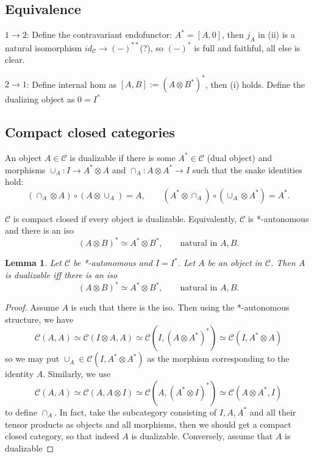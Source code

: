 \documentclass[12pt]{article}
\newtheorem{lemma}{Lemma}
\theoremstyle{definition}
\theoremstyle{remark}
\def\Ce{\mathcal C}
\begin{document}
\subsection{Equivalence}

{$1\to 2$:} \enspace
Define the contravariant endofunctor: $A^*=[A,0]$, then $j_A$ in (ii) is a natural
isomorphism $id_\Ce \to (-)^{**}$(?), so $(-)^*$ is full and faithful, all else is clear.

\medskip

\noindent 
$2\to 1$: \enspace
Define internal hom as $[A,B]:=(A\otimes B^*)^*$, then (i) holds. Define the dualizing object as $0=I^*$

\subsection{Compact closed categories}


An object $A\in \Ce$ is dualizable if there is some $A^*\in \Ce$ (dual object) and
morphisms $\cup_A: I\to A^*\otimes A$ and $\cap_A: A\otimes A^*\to I$ such that the snake
identities hold:
\[
(\cap_A\otimes A)\circ (A\otimes \cup_A)=A,\qquad (A^*\otimes
\cap_A)\circ (\cup_A\otimes A^*)=A^*.
\]

$\Ce$ is compact closed if every object is dualizable.
Equivalently, $\Ce$ is *-autonomous and there is an iso 
\[
(A\otimes B)^*\simeq A^*\otimes B^*,\qquad \text{natural in } A,B.
\]

\begin{lemma} Let $\Ce$ be *-autonomous and $I=I^*$. Let  $A$ be an object in $\Ce$. Then $A$ is dualizable
iff there is an iso
\[
(A\otimes B)^*\simeq A^*\otimes B^*,\qquad \text{natural in } A, B.
\]
\end{lemma}

\begin{proof} Assume $A$ is such that there is the iso. Then using the *-autonomous
structure, we have
\[
\Ce(A,A)\simeq \Ce(I\otimes A,A)\simeq \Ce(I,(A\otimes A^*)^*)\simeq \Ce(I,A^*\otimes A)
\]
so we may put $\cup_A\in \Ce(I,A^*\otimes A^*)$ as the morphism corresponding to the
identity $A$. Similarly, we use
\[
\Ce(A,A)\simeq \Ce(A,A\otimes I)\simeq \Ce(A,(A^*\otimes I)^*)\simeq\Ce(A\otimes A^*,I)
\]
to define $\cap_A$. In fact, take the subcategory consisting of  $I,A,A^*$ and all their
tensor products as objects and all morphisms, then we should get a compact closed
category, so that indeed $A$ is dualizable. Conversely, assume that $A$ is dualizable




\end{proof}
\end{document}
